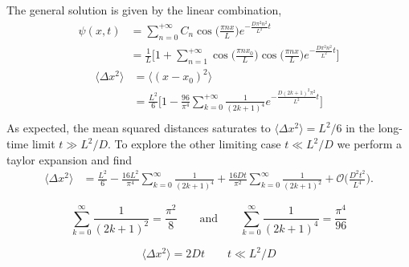The general solution is given by the linear combination,
\begin{align*}
  \psi(x,t) &= \sum_{n=0}^{+\infty} C_n \cos\Big(\frac{\pi n x}{L}\Big) e^{- \frac{D\pi^2
  n^2}{L^2}t}\\
            &=\frac{1}{L} \Bigg[ 1 + \sum_{n=1}^{+\infty} \cos\Big(\frac{\pi n
  x_0}{L}\Big) \cos\Big(\frac{\pi n x}{L}\Big) e^{- \frac{D\pi^2  n^2}{L^2}t}\Bigg]
\end{align*}
\begin{align*}
  \langle \Delta x^2 \rangle &= \langle(x-x_0)^2\rangle\\&= \frac{L^2}{6}\Bigg[1 -
  \frac{96}{\pi^4}
  \sum_{k=0}^{+\infty} \frac{1}{(2k+1)^4} e^{- \frac{D(2k+1)^2 \pi^2}{L^2}t}\Bigg]\\
\end{align*}
As expected, the mean squared distances saturates to $\langle \Delta x^2 \rangle = L^2/6$
in the long-time limit $t \gg L^2 / D.$ To explore the other limiting case $t \ll L^2/D
$ we perform a taylor expansion and find
\begin{align*}
  \langle \Delta x^2 \rangle &= \frac{L^2}{6} - \frac{16 L^2}{\pi^4} \sum_{k=0}^{\infty}
  \frac{1}{(2k+1)^4} + \frac{16 D t}{\pi^2} \sum_{k=0}^{\infty} \frac{1}{(2k+1)^2} +
  \mathcal{O}\bigg(\frac{D^2 t^2}{L^4}\bigg).
\end{align*}

\cite{BICKEL200724}

\begin{equation*}
  \sum_{k=0}^{\infty} \frac{1}{(2k+1)^2} = \frac{\pi^2}{8} \qquad \text{and} \qquad
  \sum_{k=0}^{\infty} \frac{1}{(2k+1)^4} = \frac{\pi^4}{96}
\end{equation*}

\begin{equation*}
\langle \Delta x^2 \rangle = 2Dt \qquad t \ll L^2/D
\end{equation*}
